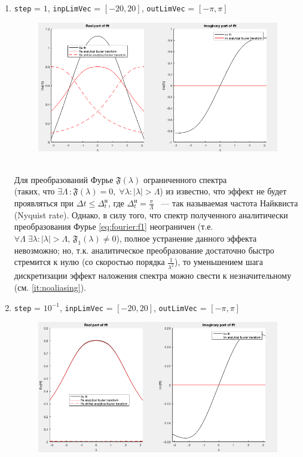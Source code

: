 \documentclass[11pt, oneside, final]{article}
\numberwithin{equation}{section}
\newcounter{icount}
\newcommand \four[1][\lambda]{\mathfrak{F}(#1)}
\begin{document}
    \begin{enumerate}
        \setcounter{enumi}{\value{icount}}
        \item 
        \texttt{step} = \(1\), \texttt{inpLimVec} = \( [-20, 20] \), \texttt{outLimVec} = \( [-\pi, \pi] \)
        \begin{figure}[!h]
            \centering
            \includegraphics[width=\linewidth]{f1fig4}
            \label{pic:f1:4}
        \end{figure} \\
        Для преобразований Фурье \( \four \) ограниченного спектра \\ (таких, что \( \exists\Lambda \, \colon \four =0, \; \forall \lambda \colon |\lambda| > \Lambda \))
        из \cite{Roublev:fourier} известно, что эффект не будет проявляться при \(\Delta t \leqslant \Delta_{t}^\text{н}\),
        где \(\Delta_{t}^\text{н} = \frac{\pi}{\Lambda}\) ~--- так называемая частота Найквиста (Nyquist rate).
        Однако, в силу того, что спектр полученного аналитически преобразования Фурье \eqref{eq:fourier:f1} 
        неограничен (т.е. \(\forall \Lambda \; \exists \lambda \colon |\lambda| > \Lambda, \, \mathfrak{F_1}(\lambda) \not = 0 \)),
        полное устранение данного эффекта невозможно;
        но, т.к. аналитическое преобразование достаточно быстро стремится к нулю (со скоростью порядка \(\frac{1}{\lambda^2}\)), 
        то уменьшением шага дискретизации эффект наложения спектра можно свести к незначительному (см. \ref{it:noaliasing}).
        \clearpage
        \item
        \label{it:noaliasing}
        \texttt{step} = \(10^{-1}\), \texttt{inpLimVec} = \( [-20, 20] \), \texttt{outLimVec} = \( [-\pi, \pi] \)
        \begin{figure}[!h]
            \centering
            \includegraphics[width=\linewidth]{f1fig5}

\end{figure}
\end{enumerate}
\end{document}
